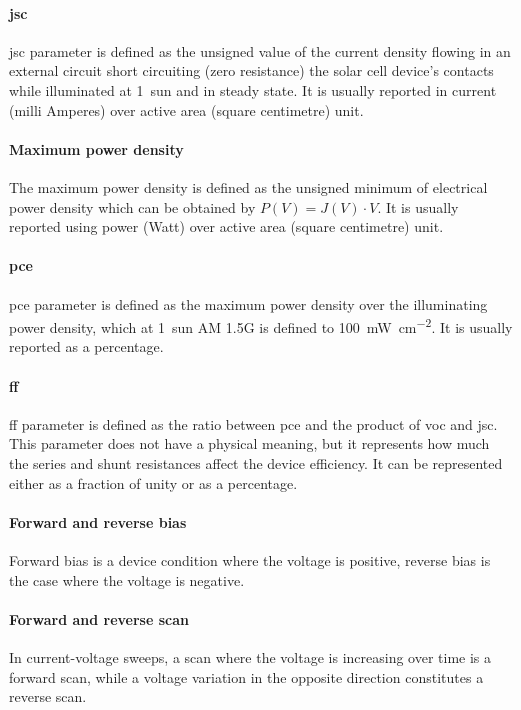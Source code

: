 		\paragraph{\Glsdesc{jsc}} \Gls{jsc} parameter is defined as the unsigned value of the current density flowing in an external circuit short circuiting (zero resistance) the solar cell device's contacts while illuminated at 1~sun and in steady state.
		It is usually reported in current (milli Amperes) over active area (square centimetre) unit.

		\paragraph{Maximum power density} The maximum power density is defined as the unsigned minimum of electrical power density which can be obtained by $P(V) = J(V) \cdot V$.
		It is usually reported using power (Watt) over active area (square centimetre) unit.

		\paragraph{\Glsdesc{pce}} \Gls{pce} parameter is defined as the maximum power density over the illuminating power density, which at 1~sun AM 1.5G is defined to \SI{100}{\mW\per\square\cm}.
		It is usually reported as a percentage.

		\paragraph{\Glsdesc{ff}} \Gls{ff} parameter is defined as the ratio between \gls{pce} and the product of \gls{voc} and \gls{jsc}.
		This parameter does not have a physical meaning, but it represents how much the series and shunt resistances affect the device efficiency.
		It can be represented either as a fraction of unity or as a percentage.

		\paragraph{Forward and reverse bias} Forward bias is a device condition where the voltage is positive, reverse bias is the case where the voltage is negative.

		\paragraph{Forward and reverse scan} In current-voltage sweeps, a scan where the voltage is increasing over time is a forward scan, while a voltage variation in the opposite direction constitutes a reverse scan.

